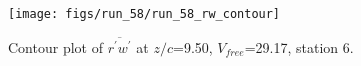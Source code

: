 \begin{figure}[H]
\centering
\texttt{[image: figs/run\_58/run\_58\_rw\_contour]}
\caption{Contour plot of $\overline{r^\prime w^\prime}$ at $z/c$=9.50, $V_{free}$=29.17, station 6.}
\label{fig:run_58_rw_contour}
\end{figure}


